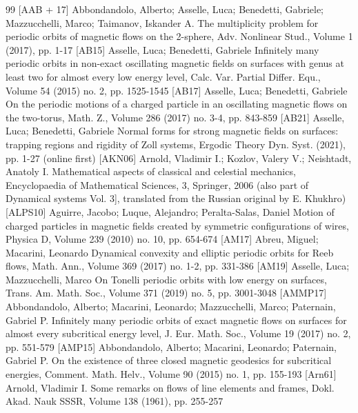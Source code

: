 \begin{thebibliography}{99}
 [AAB + 17] Abbondandolo, Alberto; Asselle, Luca; Benedetti, Gabriele; Mazzucchelli, Marco; Taimanov, Iskander A. The multiplicity problem for periodic orbits of magnetic flows on the 2-sphere, Adv. Nonlinear Stud., Volume 1 (2017), pp. 1-17
 [AB15] Asselle, Luca; Benedetti, Gabriele Infinitely many periodic orbits in non-exact oscillating magnetic fields on surfaces with genus at least two for almost every low energy level, Calc. Var. Partial Differ. Equ., Volume 54 (2015) no. 2, pp. 1525-1545
 [AB17] Asselle, Luca; Benedetti, Gabriele On the periodic motions of a charged particle in an oscillating magnetic flows on the two-torus, Math. Z., Volume 286 (2017) no. 3-4, pp. 843-859
 [AB21] Asselle, Luca; Benedetti, Gabriele Normal forms for strong magnetic fields on surfaces: trapping regions and rigidity of Zoll systems, Ergodic Theory Dyn. Syst. (2021), pp. 1-27 (online first)
 [AKN06] Arnold, Vladimir I.; Kozlov, Valery V.; Neishtadt, Anatoly I. Mathematical aspects of classical and celestial mechanics, Encyclopaedia of Mathematical Sciences, 3, Springer, 2006 (also part of Dynamical systems Vol. 3], translated from the Russian original by E. Khukhro)
 [ALPS10] Aguirre, Jacobo; Luque, Alejandro; Peralta-Salas, Daniel Motion of charged particles in magnetic fields created by symmetric configurations of wires, Physica D, Volume 239 (2010) no. 10, pp. 654-674
 [AM17] Abreu, Miguel; Macarini, Leonardo Dynamical convexity and elliptic periodic orbits for Reeb flows, Math. Ann., Volume 369 (2017) no. 1-2, pp. 331-386
 [AM19] Asselle, Luca; Mazzucchelli, Marco On Tonelli periodic orbits with low energy on surfaces, Trans. Am. Math. Soc., Volume 371 (2019) no. 5, pp. 3001-3048
 [AMMP17] Abbondandolo, Alberto; Macarini, Leonardo; Mazzucchelli, Marco; Paternain, Gabriel P. Infinitely many periodic orbits of exact magnetic flows on surfaces for almost every subcritical energy level, J. Eur. Math. Soc., Volume 19 (2017) no. 2, pp. 551-579
 [AMP15] Abbondandolo, Alberto; Macarini, Leonardo; Paternain, Gabriel P. On the existence of three closed magnetic geodesics for subcritical energies, Comment. Math. Helv., Volume 90 (2015) no. 1, pp. 155-193
 [Arn61] Arnold, Vladimir I. Some remarks on flows of line elements and frames, Dokl. Akad. Nauk SSSR, Volume 138 (1961), pp. 255-257

\end{thebibliography}
